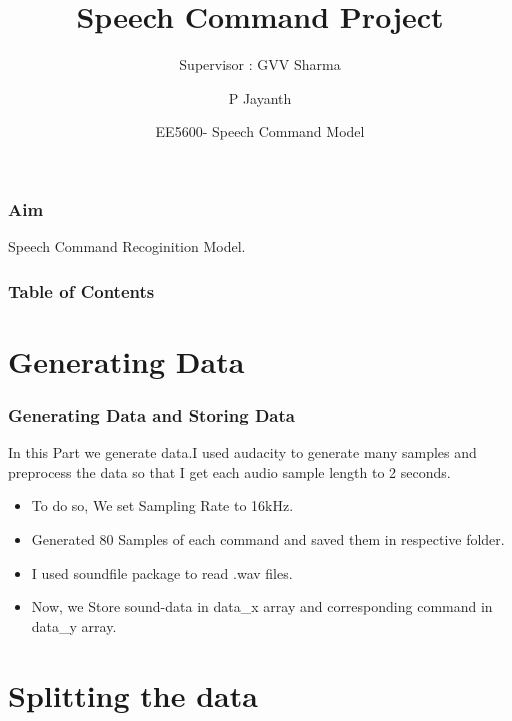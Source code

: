 \documentclass{beamer}
\title[Speech Command Project] %
{Speech Command Project}
\author[P Jayanth] %
{P Jayanth}
\institute[ma18btech11004] %
{MA18BTECH11004}
\subtitle{Supervisor : GVV Sharma}
\date[EE5600] %
{EE5600- Speech Command Model}
\begin{document}
\frame{\titlepage}



\begin{frame}
\frametitle{Aim}
\begin{center}
    Speech Command Recoginition Model.
\end{center}
    
\end{frame}

\begin{frame}
\frametitle{Table of Contents}
\tableofcontents
\end{frame}


\section{Generating Data}


\begin{frame}
\frametitle{Generating Data and Storing Data}

In this Part we generate data.I used audacity to generate many samples and preprocess the data so that I get each audio sample length to 2 seconds.\\

\begin{itemize}
    \item<1-> To do so, We set Sampling Rate to 16kHz. 
    \item<2-> Generated  80 Samples of each command and saved them in respective folder.
    \item<3-> I used soundfile package to read .wav files. 
    \item<4-> Now, we Store sound-data in data\_x array and corresponding  command in data\_y array.
\end{itemize}
\end{frame}




\section{Splitting the data}
\end{document}
